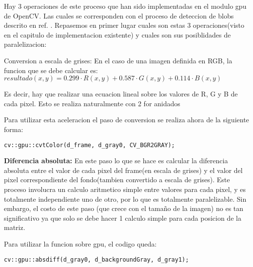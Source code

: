 \documentclass[a4paper,10pt]{report}
\begin{document}
Hay 3 operaciones de este proceso que han sido implementadas en el modulo gpu de OpenCV. Las cuales se corresponden con el proceso de deteccion de blobs descrito en ref. \cite[capitulo 5.1]{Jaureguiberry}.
Repasemos en primer lugar cuales son estas 3 operaciones(visto en el capitulo de implementacion existente) y cuales son sus posiblidades de paralelizacion:

Conversion a escala de grises: En el caso de una imagen definida en RGB, la funcion que se debe calcular es: \\
 $resultado(x,y)= 0.299  \cdot R(x,y) + 0.587  \cdot G(x,y) + 0.114  \cdot B(x,y)$  
 
 Es decir, hay que realizar una ecuacion lineal sobre los valores de R, G y B de cada pixel. 
 Esto se realiza naturalmente con 2 for anidados
 

 
 
 
 
 
Para utilizar esta aceleracion el paso de conversion se realiza ahora de la siguiente forma:


\begin{lstlisting}[columns=flexible,basicstyle=\ttfamily\small\bfseries]
  cv::gpu::cvtColor(d_frame, d_gray0, CV_BGR2GRAY);
\end{lstlisting}



 
 \textbf{ Diferencia absoluta:} En este paso lo que se hace es calcular la diferencia absoluta entre el valor de cada pixel del frame(en escala de grises) y el valor del pixel correspondiente del fondo(tambien convertido a escala de grises). 
 Este proceso involucra un calculo aritmetico simple entre valores para cada pixel, y es totalmente independiente uno de otro, por lo que es totalmente paralelizable. 
 Sin embargo, el costo de este paso (que crece con el tamaño de la imagen) no es tan significativo ya que solo se debe hacer 1 calculo simple para cada posicion de la matriz.

 
 
 
 Para utilizar la funcion sobre gpu, el codigo queda:
  \begin{lstlisting}[columns=flexible,basicstyle=\ttfamily\small\bfseries]
 cv::gpu::absdiff(d_gray0, d_backgroundGray, d_gray1);
\end{lstlisting}
\end{document}
